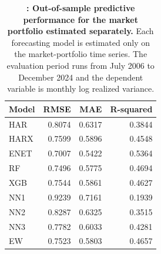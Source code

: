 \begin{table}[htbp]
\centering\footnotesize
\captionsetup{justification=raggedright,labelsep=none,singlelinecheck=false,labelformat=boldlabel}
\renewcommand{\arraystretch}{1.15}
\setlength{\tabcolsep}{4pt}
\caption[Out-of-sample predictive performance for the market portfolio estimated separately.]{\footnotesize \textbf{: Out-of-sample predictive performance for the market portfolio estimated separately.} Each forecasting model is estimated only on the market-portfolio time series. The evaluation period runs from July 2006 to December 2024 and the dependent variable is monthly log realized variance.}\label{tab:rv-additional_scopes}
\begin{tabular}{lrrr}
\hline
Model & RMSE & MAE & R-squared \\
\hline
HAR & 0.8074 & 0.6317 & 0.3844 \\
HARX & 0.7599 & 0.5896 & 0.4548 \\
ENET & 0.7007 & 0.5422 & 0.5364 \\
RF & 0.7496 & 0.5775 & 0.4694 \\
XGB & 0.7544 & 0.5861 & 0.4627 \\
NN1 & 0.9239 & 0.7161 & 0.1939 \\
NN2 & 0.8287 & 0.6325 & 0.3515 \\
NN3 & 0.7782 & 0.6033 & 0.4281 \\
EW & 0.7523 & 0.5803 & 0.4657 \\
\hline
\end{tabular}
\end{table}
